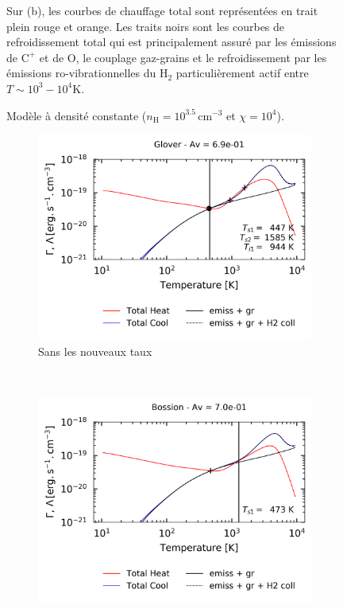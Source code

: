 \begin{figure}[!h]
\begin{subfigure}[t]{0.49\textwidth}
    \end{subfigure}
    \caption{Modèle à densité constante ($n_\mathrm{H} = 10^{3.5}\,\mathrm{cm}^{-3}$ et $\chi = 10^4$).}
    \begin{minipage}{\textwidth}
    Sur (b), les courbes de chauffage total sont représentées en trait plein rouge et orange. Les traits noirs sont les courbes de refroidissement total qui est principalement assuré par les émissions de $\mathrm{C}^+$ et de $\mathrm{O}$, le couplage gaz-grains et le refroidissement par les émissions ro-vibrationnelles du $\mathrm{H}_2$ particulièrement actif entre $T\sim10^3-10^4$K.
    \end{minipage}
\end{figure}

\begin{figure}[!h]
    \centering
    \begin{subfigure}[t]{0.49\textwidth} %
        \centering \includegraphics[trim = {0 0 0 1cm },clip,width=1\textwidth]{figure/H2/pic/glover_cooling.png}
        \caption{Sans les nouveaux taux}
        \label{fig:H2:Glover:cooling}
    \end{subfigure}
    ~ 
    \begin{subfigure}[t]{0.49\textwidth}
        \centering \includegraphics[trim = {0 0 0 1cm },clip,width=1\textwidth]{figure/H2/pic/bossion_cooling.png}

\end{subfigure}
\end{figure}
